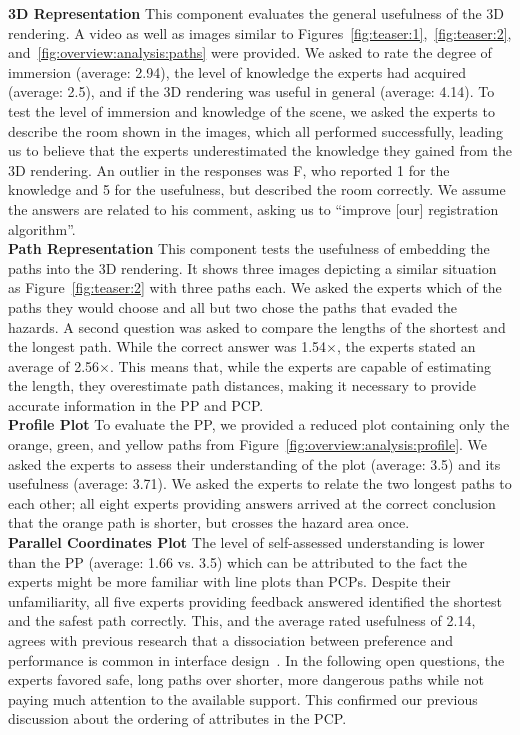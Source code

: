 \documentclass{egpubl}
\begin{document}
\noindent \textbf{3D Representation} This component evaluates the general usefulness of the 3D rendering. A video as well as images similar to Figures~\ref{fig:teaser:1},~\ref{fig:teaser:2}, and~\ref{fig:overview:analysis:paths} were provided. We asked to rate the degree of immersion (average: 2.94), the level of knowledge the experts had acquired (average: 2.5), and if the 3D rendering was useful in general (average: 4.14). To test the level of immersion and knowledge of the scene, we asked the experts to describe the room shown in the images, which all performed successfully, leading us to believe that the experts underestimated the knowledge they gained from the 3D rendering. An outlier in the responses was F, who reported 1 for the knowledge and 5 for the usefulness, but described the room correctly. We assume the answers are related to his comment, asking us to ``improve [our] registration algorithm''. \\
%
\textbf{Path Representation} This component tests the usefulness of embedding the paths into the 3D rendering. It shows three images depicting a similar situation as Figure~\ref{fig:teaser:2} with three paths each. We asked the experts which of the paths they would choose and all but two chose the paths that evaded the hazards. A second question was asked to compare the lengths of the shortest and the longest path. While the correct answer was 1.54$\times$, the experts stated an average of 2.56$\times$. This means that, while the experts are capable of estimating the length, they overestimate path distances, making it necessary to provide accurate information in the PP and PCP.\\
%
\textbf{Profile Plot} To evaluate the PP, we provided a reduced plot containing only the orange, green, and yellow paths from Figure~\ref{fig:overview:analysis:profile}. We asked the experts to assess their understanding of the plot (average: 3.5) and its usefulness (average: 3.71). We asked the experts to relate the two longest paths to each other; all eight experts providing answers arrived at the correct conclusion that the orange path is shorter, but crosses the hazard area once. \\
%
\textbf{Parallel Coordinates Plot} The level of self-assessed understanding is lower than the PP (average: 1.66 vs. 3.5) which can be attributed to the fact the experts might be more familiar with line plots than PCPs. Despite their unfamiliarity, all five experts providing feedback answered identified the shortest and the safest path correctly. This, and the average rated usefulness of 2.14,  agrees with previous research that a dissociation between preference and performance is common in interface design~\cite{andre1995users}. In the following open questions, the experts favored safe, long paths over shorter, more dangerous paths while not paying much attention to the available support. This confirmed our previous discussion about the ordering of attributes in the PCP.\\
\end{document}
